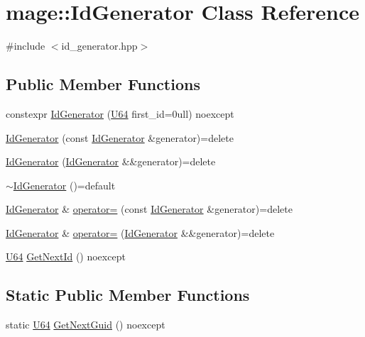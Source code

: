 \hypertarget{classmage_1_1_id_generator}{}\section{mage\+:\+:Id\+Generator Class Reference}
\label{classmage_1_1_id_generator}


{\ttfamily \#include $<$id\+\_\+generator.\+hpp$>$}

\subsection*{Public Member Functions}
\begin{DoxyCompactItemize}
\item 
constexpr \mbox{\hyperlink{classmage_1_1_id_generator_aabc8fb01d9c7be4ecc3ae78410b06563}{Id\+Generator}} (\mbox{\hyperlink{namespacemage_ae0ad2dd0035dba92ed0f2e84c182b03b}{U64}} first\+\_\+id=0ull) noexcept
\item 
\mbox{\hyperlink{classmage_1_1_id_generator_a1abb8c44b89ac1344ad8016f54e076de}{Id\+Generator}} (const \mbox{\hyperlink{classmage_1_1_id_generator}{Id\+Generator}} \&generator)=delete
\item 
\mbox{\hyperlink{classmage_1_1_id_generator_a0f678af51553c455655589ecfe7f1c8f}{Id\+Generator}} (\mbox{\hyperlink{classmage_1_1_id_generator}{Id\+Generator}} \&\&generator)=delete
\item 
\mbox{\hyperlink{classmage_1_1_id_generator_a70161ab5b10294ebba1ace7a3b0f8d31}{$\sim$\+Id\+Generator}} ()=default
\item 
\mbox{\hyperlink{classmage_1_1_id_generator}{Id\+Generator}} \& \mbox{\hyperlink{classmage_1_1_id_generator_adf4539050d910996e914df51f22236c6}{operator=}} (const \mbox{\hyperlink{classmage_1_1_id_generator}{Id\+Generator}} \&generator)=delete
\item 
\mbox{\hyperlink{classmage_1_1_id_generator}{Id\+Generator}} \& \mbox{\hyperlink{classmage_1_1_id_generator_aeb8bfd849689d74eb450b0c1c2044086}{operator=}} (\mbox{\hyperlink{classmage_1_1_id_generator}{Id\+Generator}} \&\&generator)=delete
\item 
\mbox{\hyperlink{namespacemage_ae0ad2dd0035dba92ed0f2e84c182b03b}{U64}} \mbox{\hyperlink{classmage_1_1_id_generator_ae51ebc69faac9974553b7c647981dc57}{Get\+Next\+Id}} () noexcept
\end{DoxyCompactItemize}
\subsection*{Static Public Member Functions}
\begin{DoxyCompactItemize}
\item 
static \mbox{\hyperlink{namespacemage_ae0ad2dd0035dba92ed0f2e84c182b03b}{U64}} \mbox{\hyperlink{classmage_1_1_id_generator_af6df2ba2fb7172e7753c69a4aec1e6bf}{Get\+Next\+Guid}} () noexcept
\end{DoxyCompactItemize}
